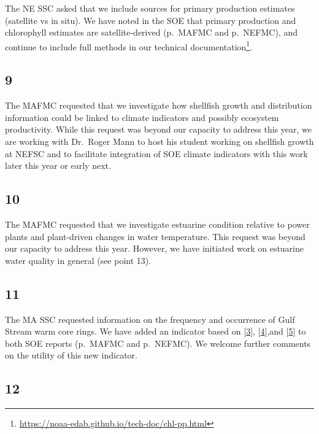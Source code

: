\documentclass[
  10pt,
]{article}
\begin{document}
The NE SSC asked that we include sources for primary production
estimates (satellite vs in situ). We have noted in the SOE that primary
production and chlorophyll estimates are satellite-derived (p.~MAFMC and
p.~NEFMC), and continue to include full methods in our technical
documentation\footnote{\url{https://noaa-edab.github.io/tech-doc/chl-pp.html}}.

\hypertarget{section-8}{%
\subsection{9}\label{section-8}}

The MAFMC requested that we investigate how shellfish growth and
distribution information could be linked to climate indicators and
possibly ecosystem productivity. While this request was beyond our
capacity to address this year, we are working with Dr.~Roger Mann to
host his student working on shellfish growth at NEFSC and to facilitate
integration of SOE climate indicators with this work later this year or
early next.

\hypertarget{section-9}{%
\subsection{10}\label{section-9}}

The MAFMC requested that we investigate estuarine condition relative to
power plants and plant-driven changes in water temperature. This request
was beyond our capacity to address this year. However, we have initiated
work on estuarine water quality in general (see point 13).

\hypertarget{section-10}{%
\subsection{11}\label{section-10}}

The MA SSC requested information on the frequency and occurrence of Gulf
Stream warm core rings. We have added an indicator based on
{[}\protect\hyperlink{ref-andres_recent_2016}{3}{]},
{[}\protect\hyperlink{ref-gawarkiewicz_changing_2018}{4}{]},and
{[}\protect\hyperlink{ref-gangopadhyay_observed_2019}{5}{]} to both SOE
reports (p.~MAFMC and p.~NEFMC). We welcome further comments on the
utility of this new indicator.

\hypertarget{section-11}{%
\subsection{12}\label{section-11}}
\end{document}
